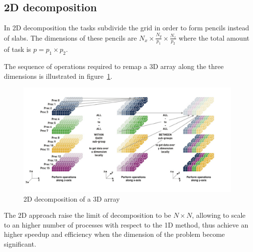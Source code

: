 \subsection{2D decomposition}
In 2D decomposition the tasks subdivide the grid in order to form pencils instead of slabs. The dimensions of these pencils are $N_{x}\times \frac{N_{y}}{p_{1}}\times \frac{N_{z}}{p_{2}}$ where the total amount of task is $p = p_{1}\times p_{2}$.
\par
The sequence of operations required to remap a 3D array along the three dimensions is illustrated in figure~\ref{2d:decomp}. 
\par
\begin{figure}[h]
\begin{center}
\includegraphics[width=1.08\textwidth]{grafici/2d_decomp}
\caption{2D decomposition of a 3D array}
\label{2d:decomp}
\end{center}
\end{figure}
The 2D approach raise the limit of decomposition to be $N\times N$, allowing to scale to an higher number of processes with respect to the 1D method, thus achieve an higher speedup and efficiency when the dimension of the problem become significant.

